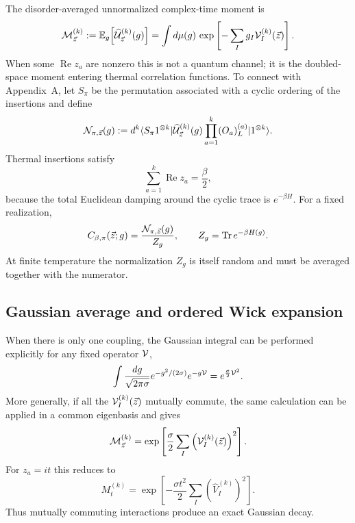 \documentclass{article}
\theoremstyle{definition}
\begin{document}
The disorder-averaged unnormalized complex-time moment is
\begin{equation}
    {\cal M}_{\vec z}^{(k)}
    :=\mathbb E_g\!\left[\widehat{\cal U}_{\vec z}^{(k)}(g)\right]
    =\int d\mu(g)\,
    \exp\left[-\sum_I g_I{\cal V}_I^{(k)}(\vec z)\right].
    \label{eq:quenched_complex_moment}
\end{equation}
When some $\operatorname{Re}z_a$ are nonzero this is not a quantum channel; it is the doubled-space moment entering thermal correlation functions. To connect with Appendix~A, let $S_\pi$ be the permutation associated with a cyclic ordering of the insertions and define
\begin{equation}
    {\cal N}_{\pi,\vec z}(g)
    :=d^k\langle S_\pi1^{\otimes k}|
    \widehat{\cal U}_{\vec z}^{(k)}(g)
    \prod_{a=1}^k(O_a)_L^{(a)}
    |1^{\otimes k}\rangle.
\end{equation}
Thermal insertions satisfy
\begin{equation}
    \sum_{a=1}^k\operatorname{Re}z_a=\frac{\beta}{2},
    \label{eq:quenched_thermal_strip}
\end{equation}
because the total Euclidean damping around the cyclic trace is $e^{-\beta H}$. For a fixed realization,
\begin{equation}
    C_{\beta,\pi}(\vec z;g)
    =\frac{{\cal N}_{\pi,\vec z}(g)}{Z_g},
    \qquad
    Z_g=\operatorname{Tr}e^{-\beta H(g)}.
    \label{eq:quenched_thermal_correlator}
\end{equation}
At finite temperature the normalization $Z_g$ is itself random and must be averaged together with the numerator.

\subsection{Gaussian average and ordered Wick expansion}

When there is only one coupling, the Gaussian integral can be performed explicitly for any fixed operator ${\cal V}$,
\begin{equation}
    \int\frac{dg}{\sqrt{2\pi\sigma}}
    e^{-g^2/(2\sigma)}e^{-g{\cal V}}
    =e^{\frac{\sigma}{2}{\cal V}^2}.
\end{equation}
More generally, if all the ${\cal V}_I^{(k)}(\vec z)$ mutually commute, the same calculation can be applied in a common eigenbasis and gives
\begin{equation}
    {\cal M}_{\vec z}^{(k)}
    =\exp\left[
        \frac{\sigma}{2}\sum_I
        \left({\cal V}_I^{(k)}(\vec z)\right)^2
    \right].
    \label{eq:quenched_complex_commuting}
\end{equation}
For $z_a=it$ this reduces to
\begin{equation}
    M_t^{(k)}
    =\exp\left[-\frac{\sigma t^2}{2}
        \sum_I\left(\widehat V_I^{(k)}\right)^2
    \right].
    \label{eq:quenched_realtime_commuting}
\end{equation}
Thus mutually commuting interactions produce an exact Gaussian decay.
\end{document}
